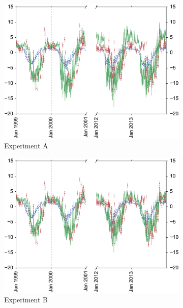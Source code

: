 \documentclass[11pt]{article}
\begin{document}
\begin{figure}
    \centering
    \begin{subfigure}[b]{0.49\textwidth}
        \includegraphics[width=\textwidth]{Abroke4dvar.eps}
        \caption{Experiment A}
        \label{fig:4dvardiagBR}
    \end{subfigure}
    \begin{subfigure}[b]{0.49\textwidth}
        \includegraphics[width=\textwidth]{Bbroke4dvar.eps}
        \caption{Experiment B}
        \label{fig:4dvaredcBR}
    \end{subfigure}
    \begin{subfigure}[b]{0.49\textwidth}

\end{subfigure}
\end{figure}
\end{document}
